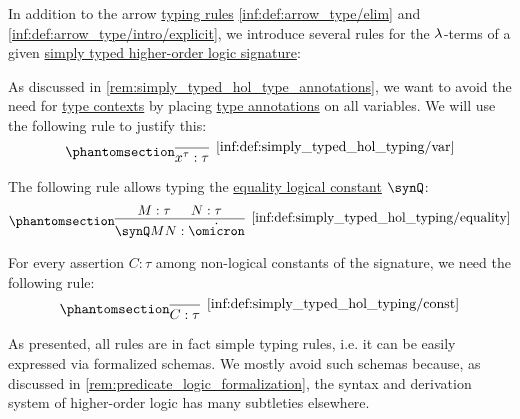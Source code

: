 \begin{definition}\label{def:simply_typed_hol_typing}\mimprovised
  In addition to the arrow \hyperref[con:typing_rule]{typing rules} \ref{inf:def:arrow_type/elim} and \ref{inf:def:arrow_type/intro/explicit}, we introduce several rules for the \( {\mathrm \lambda} \)-terms of a given \hyperref[def:simply_typed_hol_signature]{simply typed higher-order logic signature}:
  \begin{thmenum}
     As discussed in \cref{rem:simply_typed_hol_type_annotations}, we want to avoid the need for \hyperref[def:type_context]{type contexts} by placing \hyperref[con:type_annotation]{type annotations} on all variables. We will use the following rule to justify this:
    \begin{equation*}\taglabel[\ensuremath{ \logic{Var} }]{inf:def:simply_typed_hol_typing/var}
      \begin{prooftree}
        \infer0[\ref{inf:def:simply_typed_hol_typing/var}]{ x^\tau: \tau }
      \end{prooftree}
    \end{equation*}

     The following rule allows typing the \hyperref[def:simply_typed_hol_signature/const]{equality logical constant} \( \synQ \):
    \begin{equation*}\taglabel[\ensuremath{ Q_+ }]{inf:def:simply_typed_hol_typing/equality}
      \begin{prooftree}
        \hypo{ M: \tau }
        \hypo{ N: \tau }
        \infer2[\ref{inf:def:simply_typed_hol_typing/equality}]{ \synQ M N: \syn\omicron }
      \end{prooftree}
    \end{equation*}

     For every assertion \( C: \tau \) among non-logical constants of the signature, we need the following rule:
    \begin{equation*}\taglabel[\ensuremath{ \logic{Ax}_C }]{inf:def:simply_typed_hol_typing/const}
      \begin{prooftree}
        \infer0[\ref{inf:def:simply_typed_hol_typing/const}]{ C: \tau }
      \end{prooftree}
    \end{equation*}
  \end{thmenum}
\end{definition}
\begin{comments}
  \item As presented, all rules are in fact simple typing rules, i.e. it can be easily expressed via formalized schemas. We mostly avoid such schemas because, as discussed in \cref{rem:predicate_logic_formalization}, the syntax and derivation system of higher-order logic has many subtleties elsewhere.
\end{comments}

